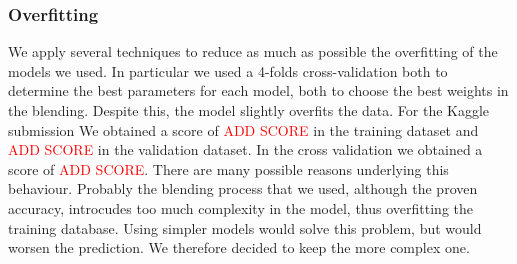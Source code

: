 \documentclass[10pt,conference,compsocconf]{IEEEtran}
\begin{document}
\subsubsection{Overfitting}
We apply several techniques to reduce as much as possible the overfitting of the models we used. In
particular we used a 4-folds cross-validation both to determine the best parameters for each model, both to
choose the best weights in the blending.
Despite this, the model slightly overfits the data. For the Kaggle submission We obtained a score of \textcolor{red}{ADD
SCORE} in the training dataset and \textcolor{red}{ADD SCORE} in the validation dataset. 
In the cross validation we obtained a score of \textcolor{red}{ADD SCORE}.
There are many possible reasons underlying this behaviour. Probably the blending process that we
used, although the proven accuracy, introcudes too much complexity in the model, thus overfitting
the training database.
Using simpler models would solve this problem, but would worsen the prediction. We therefore decided
to keep the more complex one.









\end{document}
